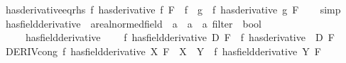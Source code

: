 \begin{isabellebody}
\endisatagproof
{\isafoldproof}%
%
\isadelimproof
\isanewline
%
\endisadelimproof
\isanewline
{}\isamarkupfalse%
\ has{\isacharunderscore}{\kern0pt}derivative{\isacharunderscore}{\kern0pt}eq{\isacharunderscore}{\kern0pt}rhs{\isacharcolon}{\kern0pt}\ {\isachardoublequoteopen}{\isacharparenleft}{\kern0pt}f\ has{\isacharunderscore}{\kern0pt}derivative\ f{\isacharprime}{\kern0pt}{\isacharparenright}{\kern0pt}\ F\ {\isasymLongrightarrow}\ f{\isacharprime}{\kern0pt}\ {\isacharequal}{\kern0pt}\ g{\isacharprime}{\kern0pt}\ {\isasymLongrightarrow}\ {\isacharparenleft}{\kern0pt}f\ has{\isacharunderscore}{\kern0pt}derivative\ g{\isacharprime}{\kern0pt}{\isacharparenright}{\kern0pt}\ F{\isachardoublequoteclose}\isanewline
%
\isadelimproof
\ \ %
\endisadelimproof
%
\isatagproof
{}\isamarkupfalse%
\ simp%
\endisatagproof
{\isafoldproof}%
%
\isadelimproof
\isanewline
%
\endisadelimproof
\isanewline
{}\isamarkupfalse%
\ has{\isacharunderscore}{\kern0pt}field{\isacharunderscore}{\kern0pt}derivative\ {\isacharcolon}{\kern0pt}{\isacharcolon}{\kern0pt}\ {\isachardoublequoteopen}{\isacharparenleft}{\kern0pt}{\isacharprime}{\kern0pt}a{\isacharcolon}{\kern0pt}{\isacharcolon}{\kern0pt}real{\isacharunderscore}{\kern0pt}normed{\isacharunderscore}{\kern0pt}field\ {\isasymRightarrow}\ {\isacharprime}{\kern0pt}a{\isacharparenright}{\kern0pt}\ {\isasymRightarrow}\ {\isacharprime}{\kern0pt}a\ {\isasymRightarrow}\ {\isacharprime}{\kern0pt}a\ filter\ {\isasymRightarrow}\ bool{\isachardoublequoteclose}\isanewline
\ \ \ \ {\isacharparenleft}{\kern0pt}\ {\isachardoublequoteopen}{\isacharparenleft}{\kern0pt}has{\isacharprime}{\kern0pt}{\isacharunderscore}{\kern0pt}field{\isacharprime}{\kern0pt}{\isacharunderscore}{\kern0pt}derivative{\isacharparenright}{\kern0pt}{\isachardoublequoteclose}\ {}{}{\isacharparenright}{\kern0pt}\isanewline
\ \ \ {\isachardoublequoteopen}{\isacharparenleft}{\kern0pt}f\ has{\isacharunderscore}{\kern0pt}field{\isacharunderscore}{\kern0pt}derivative\ D{\isacharparenright}{\kern0pt}\ F\ {\isasymlongleftrightarrow}\ {\isacharparenleft}{\kern0pt}f\ has{\isacharunderscore}{\kern0pt}derivative\ {\isacharparenleft}{\kern0pt}{\isacharasterisk}{\kern0pt}{\isacharparenright}{\kern0pt}\ D{\isacharparenright}{\kern0pt}\ F{\isachardoublequoteclose}\isanewline
\isanewline
{}\isamarkupfalse%
\ DERIV{\isacharunderscore}{\kern0pt}cong{\isacharcolon}{\kern0pt}\ {\isachardoublequoteopen}{\isacharparenleft}{\kern0pt}f\ has{\isacharunderscore}{\kern0pt}field{\isacharunderscore}{\kern0pt}derivative\ X{\isacharparenright}{\kern0pt}\ F\ {\isasymLongrightarrow}\ X\ {\isacharequal}{\kern0pt}\ Y\ {\isasymLongrightarrow}\ {\isacharparenleft}{\kern0pt}f\ has{\isacharunderscore}{\kern0pt}field{\isacharunderscore}{\kern0pt}derivative\ Y{\isacharparenright}{\kern0pt}\ F{\isachardoublequoteclose}\isanewline

\end{isabellebody}

